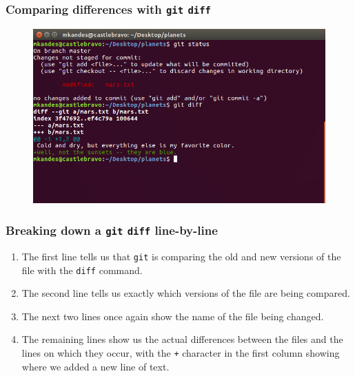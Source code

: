 \documentclass{beamer}
\begin{document}
\begin{frame}
   \frametitle{Comparing differences with \texttt{git} \texttt{diff}}
   \begin{figure}[htbp]
      \includegraphics[width=1.0\textwidth]{images/git-diff.png}
   \end{figure}
\end{frame}

\begin{frame}
   \frametitle{Breaking down a \texttt{git} \texttt{diff} line-by-line}
   \begin{enumerate}
      \setlength\itemsep{1.0em}
      \item The first line tells us that \texttt{git} is comparing the 
         old and new versions of the file with the \texttt{diff} command.
      \item The second line tells us exactly which versions of the file 
         are being compared.
      \item The next two lines once again show the name of the file 
         being changed.
      \item The remaining lines show us the actual differences between 
         the files and the lines on which they occur, with the \texttt{+} 
         character in the first column showing where we added a new line 
         of text.
   \end{enumerate}
\end{frame}
\end{document}
